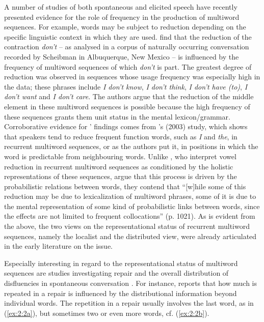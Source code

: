 A number of studies of both spontaneous and elicited speech have recently presented evidence for the role of frequency in the production of multiword sequences. For example, words may be subject to reduction depending on the specific linguistic context in which they are used. \citet{bybee-scheibman} find that the reduction of the contraction \textit{don't} -- as analysed in a corpus of naturally occurring conversation recorded by Scheibman in Albuquerque, New Mexico -- is influenced by the frequency of multiword sequences of which \textit{don't} is part. The greatest degree of reduction was observed in sequences whose usage frequency was especially high in the data; these phrases include \textit{I don't know}, \textit{I don't think}, \textit{I don't have (to)}, \textit{I don't want} and \textit{I don't care}. The authors argue that the reduction of the middle element in these multiword sequences is possible because the high frequency of these sequences grants them unit status in the mental lexicon/grammar.
Corroborative evidence for \citeauthor{bybee-scheibman}' findings comes from \citeauthor{bell-etal2003}'s (2003) study, which shows that speakers tend to reduce frequent function words, such as \textit{I} and \textit{the}, in recurrent multiword sequences, or as the authors put it, in positions in which the word is predictable from neighbouring words. Unlike \citet{bybee-scheibman}, who interpret vowel reduction in recurrent multiword sequences as conditioned by the holistic representations of these sequences, \citeauthor{bell-etal2003} argue that this process is driven by the probabilistic relations between words, they contend that ``[w]hile some of this reduction may be due to lexicalization of multiword phrases, some of it is due to the mental representation of some kind of probabilistic links between words, since the effects are not limited to frequent collocations'' (p. 1021). As is evident from the above, the two views on the representational status of recurrent multiword sequences, namely the localist and the distributed view, were already articulated in the early literature on the issue. 

Especially interesting in regard to the representational status of multiword sequences are studies investigating repair and the overall distribution of disfluencies in spontaneous conversation \citep[e.g.,][]{schneider2014}. For instance, \citet{kapatsinski2005} reports that how much is repeated in a repair is influenced by the distributional information beyond individual words. The repetition in a repair usually involves the last word, as in (\ref{ex:2:2a}), but sometimes two or even more words, cf. (\ref{ex:2:2b}).

